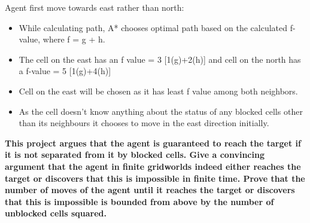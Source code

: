 \documentclass[a4 paper]{article}
\begin{document}
Agent first move towards east rather than north:
\begin{itemize}
    \item While calculating path, A* chooses optimal path based on the calculated f-value, where f = g + h.
    \item The cell on the east has an f value = 3 [1(g)+2(h)] and cell on the north has a f-value = 5 [1(g)+4(h)]
    \item Cell on the east will be chosen as it has least f value among both neighbors.
    \item As the cell doesn't know anything about the status of any blocked cells other than its neighbours it chooses to move in the east direction initially.
\end{itemize}
 \textbf{This project argues that the agent is guaranteed to reach the target if it is not separated from it by blocked cells. Give a
convincing argument that the agent in finite gridworlds indeed either reaches the target or discovers that this is impossible
in finite time. Prove that the number of moves of the agent until it reaches the target or discovers that this is impossible is
bounded from above by the number of unblocked cells squared.}\\
\end{document}
